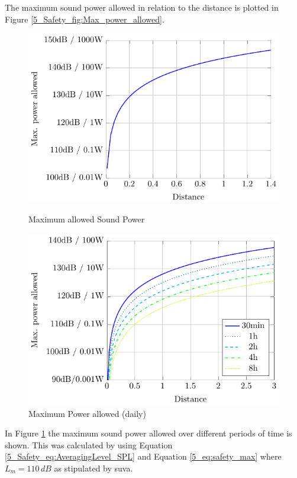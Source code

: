 The maximum sound power allowed in relation to the distance is plotted in Figure \ref{5_Safety_fig:Max_power_allowed}.
\begin{figure}[h!]
    \begin{minipage}{0.49\textwidth}
        \centering
        \includegraphics[width=\textwidth]{images/5_Safety_Risks/Max_Power_Allowed.pdf}
        \caption{Maximum allowed Sound Power}
        \label{5_Safety_fig:Max_power_allowed}
        \end{minipage}
    \begin{minipage}{0.49\textwidth}
        \centering
        \includegraphics[width=\textwidth]{images/5_Safety_Risks/Max_Power_Allowed_Time.pdf}
        \caption{Maximum Power allowed (daily)}
        \label{5_Safety_fig:Max_power_allowed:daily}
    \end{minipage}
\end{figure}
In Figure \ref{5_Safety_fig:Max_power_allowed:daily} the maximum sound power allowed over different periods of time is shown. This was calculated by using Equation \ref{5_Safety_eq:AveragingLevel_SPL} and Equation \ref{5_eq:safety_max} where $L_m = 110\,dB$ as stipulated by \acrshort{suva}.  


